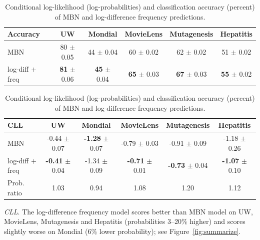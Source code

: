 \documentclass[runningheads,a4paper]{llncs}
\newcommand{\point}[1]{\noindent\emph{#1}.}
\begin{document}
\begin{table}[thbp]

\caption{Conditional log-likelihood (log-probabilities) and classification accuracy (percent) of MBN and log-difference frequency predictions.}

\begin{center}

\begin{tabular}{|l|c|c|c|c|c|}
\hline
Accuracy& UW & Mondial & MovieLens & Mutagenesis & Hepatitis \\\hline
MBN & 80 $\pm$ 0.05 & 44 $\pm$ 0.04 & 60 $\pm$ 0.02 & 62 $\pm$ 0.02 & 51 $\pm$ 0.02 \\\hline
log-diff $+$ freq & \textbf{81} $\pm$ 0.06 & \textbf{45} $\pm$ 0.04 & \textbf{65} $\pm$ 0.03 & \textbf{67} $\pm$ 0.03 & \textbf{55} $\pm$ 0.02 \\
\hline
\end{tabular}
\end{center}


\begin{center}
\begin{tabular}{|l|c|c|c|c|c|}
\hline
CLL & UW & Mondial & MovieLens & Mutagenesis & Hepatitis \\\hline
MBN & -0.44 $\pm$ 0.07 & \textbf{-1.28} $\pm$ 0.07 & -0.79 $\pm$ 0.03 & -0.91 $\pm$ 0.09 & -1.18 $\pm$ 0.26 \\
log-diff $+$ freq & \textbf{-0.41} $\pm$ 0.04 & -1.34 $\pm$ 0.09 & \textbf{-0.71} $\pm$ 0.01 & \textbf{-0.73} $\pm$ 0.04 & \textbf{-1.07} $\pm$ 0.10 \\
Prob. ratio & 1.03 & 0.94 & 1.08 & 1.20 & 1.12\\
\hline
\end{tabular}
\end{center}
\label{table:mbn}

\end{table}%


\point{CLL}
The log-difference frequency  model scores better than MBN model on UW, MovieLens, Mutagenesis and Hepatitis (probabilities 3--20\% higher) and scores slightly worse on Mondial (6\% lower probability); see Figure~\ref{fig:summarize}.
\end{document}
